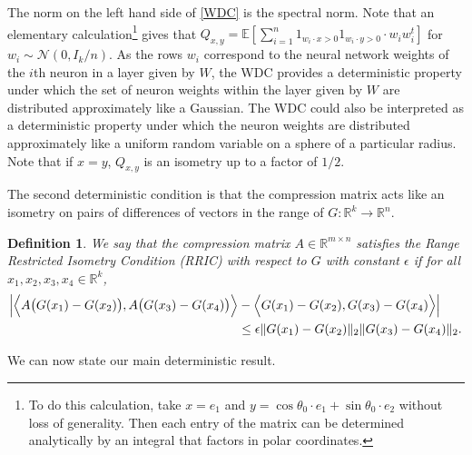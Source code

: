 \documentclass[11pt]{article}
\newtheorem{definition}[theorem]{Definition}
\newcommand{\R}{\mathbb{R}}
\newcommand{\eps}{\epsilon}
\newcommand{\red}[1]{{\color{black} #1}}
\newcommand{\indwx}{1_{w_i \cdot x > 0}}
\newcommand{\indwy}{1_{w_i \cdot y > 0}}
\newcommand{\E}{\mathbb{E}}
\newcommand{\Qxy}{Q_{x,y}}
\begin{document}
 The norm on the left hand side of \eqref{WDC} is the spectral norm.  Note that an elementary calculation\footnote{To do this calculation, take $x=e_1$ and $y = \cos \theta_0\cdot e_1 + \sin \theta_0 \cdot e_2$ without loss of generality.  Then each entry of the matrix can be determined analytically by an integral that factors in polar coordinates.} gives that $\Qxy = \E[\sum_{i=1}^n \indwx \indwy \cdot w_i w_i^t ]$ for $w_i \sim \mathcal{N}(0, I_k/n)$.  As the rows $w_i$ correspond to the neural network weights of the $i$th neuron in a layer given by $W$, the WDC provides a deterministic property under which the set of neuron weights within the layer given by $W$ are distributed approximately like a Gaussian.  The WDC could also be interpreted as a deterministic property under which the  neuron weights are distributed approximately like a uniform random variable on a sphere of a particular radius.  Note that if $x=y$, $\Qxy$ is an isometry up to a factor of $1/2$.

The second deterministic condition is that the compression matrix acts like an isometry on pairs of differences of vectors in the range of $G: \R^k \to \R^n$. 
\red{
\begin{definition}
We say that the compression matrix $A \in \R^{m \times n}$ satisfies the \emph{Range Restricted Isometry Condition (RRIC)} with respect to $G$ with constant $\eps$ if for all $x_1, x_2, x_3, x_4 \in \R^k$,
\begin{align}
\Bigl| \Bigl \langle A \bigl( G(x_1) - G(x_2) \bigr), A \bigl( G(x_3) - G(x_4) \bigr) \Bigr\rangle  &- \Bigl \langle  G(x_1) - G(x_2) ,  G(x_3) - G(x_4)  \Bigr \rangle \Bigr| \notag \\&\leq \eps \| G(x_1) - G(x_2) \|_2  \| G(x_3) - G(x_4) \|_2.
\end{align}
\end{definition}}
We can now state our main deterministic result.  
\end{document}
